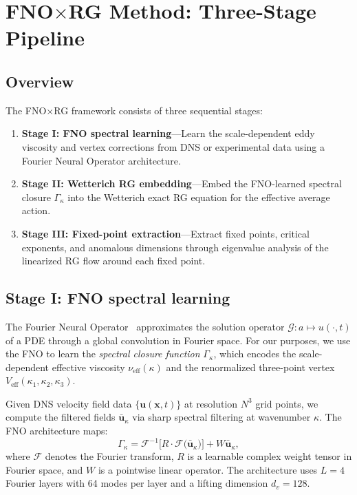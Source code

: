 \section{\texorpdfstring{FNO$\times$}{FNO x}RG Method: Three-Stage Pipeline}
\label{sec:method}

\subsection{Overview}

The FNO$\times$RG framework consists of three sequential stages:

\begin{enumerate}
\item \textbf{Stage I: FNO spectral learning}---Learn the scale-dependent eddy viscosity and vertex corrections from DNS or experimental data using a Fourier Neural Operator architecture.
\item \textbf{Stage II: Wetterich RG embedding}---Embed the FNO-learned spectral closure $\Gamma_\kappa$ into the Wetterich exact RG equation for the effective average action.
\item \textbf{Stage III: Fixed-point extraction}---Extract fixed points, critical exponents, and anomalous dimensions through eigenvalue analysis of the linearized RG flow around each fixed point.
\end{enumerate}

\subsection{Stage I: FNO spectral learning\label{subsec:stage1}}

The Fourier Neural Operator~\cite{li2021fourier} approximates the solution operator $\mathcal{G}: a \mapsto u(\cdot,t)$ of a PDE through a global convolution in Fourier space. For our purposes, we use the FNO to learn the \emph{spectral closure function} $\Gamma_\kappa$, which encodes the scale-dependent effective viscosity $\nu_{\mathrm{eff}}(\kappa)$ and the renormalized three-point vertex $V_{\mathrm{eff}}(\kappa_1,\kappa_2,\kappa_3)$.

Given DNS velocity field data $\{\mathbf{u}(\mathbf{x},t)\}$ at resolution $N^3$ grid points, we compute the filtered fields $\bar{\mathbf{u}}_\kappa$ via sharp spectral filtering at wavenumber $\kappa$. The FNO architecture maps:
{\small
\begin{equation}
 \Gamma_\kappa = \mathcal{F}^{-1}\!\Big[R\cdot\mathcal{F}\big(\bar{\mathbf{u}}_\kappa\big)\Big] + W\bar{\mathbf{u}}_\kappa,
\end{equation}
}
where $\mathcal{F}$ denotes the Fourier transform, $R$ is a learnable complex weight tensor in Fourier space, and $W$ is a pointwise linear operator. The architecture uses $L=4$ Fourier layers with 64 modes per layer and a lifting dimension $d_v=128$.

